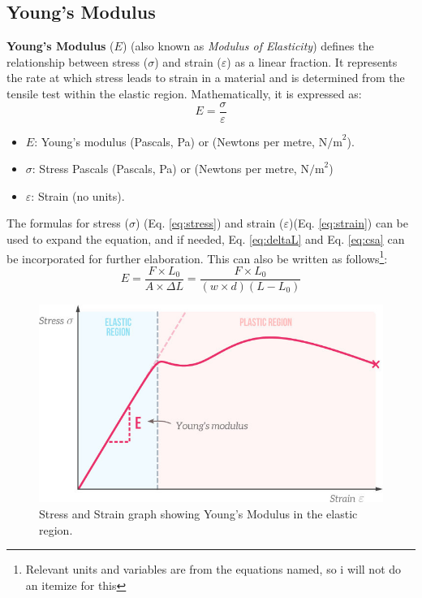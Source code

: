 \documentclass{article}
\begin{document}
    \subsection{Young's Modulus}
    \textbf{Young's Modulus} (\(E\)) (also known as \textit{Modulus of Elasticity}) defines the relationship between stress (\(\sigma\)) and strain (\(\varepsilon\)) as a linear fraction. It represents the rate at which stress leads to strain in a material and is determined from the tensile test within the elastic region. Mathematically, it is expressed as:
    \begin{equation}
        E = \frac{\sigma}{\varepsilon} 
        \label{eq:ym}
    \end{equation}
    \begin{itemize}[itemsep=-1mm]
        \item \( E \): Young's modulus (Pascals, Pa) or (Newtons per metre, \(\text{N/m}^2\)).
        \item \( \sigma \): Stress Pascals (Pascals, Pa) or (Newtons per metre, \(\text{N/m}^2\))
        \item \( \varepsilon \): Strain (no units).
    \end{itemize}    
    The formulas for stress (\( \sigma \)) (Eq. \ref{eq:stress}) and strain (\( \varepsilon \))(Eq. \ref{eq:strain}) can be used to expand the equation, and if needed, Eq. \ref{eq:deltaL} and Eq. \ref{eq:csa} can be incorporated for further elaboration. This can also be written as follows\footnote{Relevant units and variables are from the equations named, so i will not do an itemize for this}:
    \begin{equation}
        E = \frac{F \times L_0}{A\times\Delta L} = \frac{F \times L_0}{\left(w\times d\right)\left(L-L_0\right)}
    \end{equation}
{\begin{minipage}{0.5\textwidth}
    \begin{figure}[H]
        \centering
        \includegraphics[width=1\textwidth]{images/stress-strain-youngs-modulus2.jpg}
        \caption{Stress and Strain graph showing Young's Modulus in the elastic region.}
        \label{fig:young}
    \end{figure}
\end{minipage}}\hspace{1em}
\end{document}
